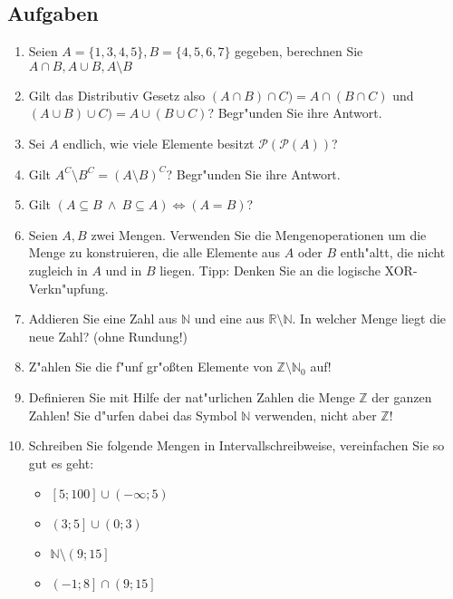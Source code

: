 \subsection{Aufgaben}
\begin{enumerate}
	\item Seien $A = \{1,3,4,5\}, B = \{4, 5, 6, 7\}$ gegeben, berechnen Sie $A \cap B, A \cup B, A \setminus B$
	\item Gilt das Distributiv Gesetz also $(A \cap B) \cap C) = A \cap (B \cap C)$ und $(A \cup B) \cup C) = A \cup (B \cup C)$? Begr"unden Sie ihre Antwort.
	\item Sei $A$ endlich, wie viele Elemente besitzt $\mathcal{P}(\mathcal{P}(A))$?
	\item Gilt $A^C \setminus B^C = (A \setminus B)^C$? Begr"unden Sie ihre Antwort.
	\item Gilt $(A \subseteq B \ \land \ B \subseteq A) \iff (A = B)$?
	\item Seien $A, B$ zwei Mengen. Verwenden Sie die Mengenoperationen um die Menge zu konstruieren, die alle Elemente aus $A$ oder $B$ enth"altt, die nicht zugleich in $A$ und in $B$ liegen. Tipp: Denken Sie an die logische XOR-Verkn"upfung.
	\item Addieren Sie eine Zahl aus $\mathbb N$ und eine aus $\mathbb R \setminus \mathbb N$. In welcher Menge liegt die neue Zahl? (ohne Rundung!)
	\item Z"ahlen Sie die f"unf gr"oßten Elemente von $\mathbb Z \setminus \mathbb N_0$ auf!
	\item Definieren Sie mit Hilfe der nat"urlichen Zahlen die Menge $\mathbb{Z}$ der ganzen Zahlen! Sie d"urfen dabei das Symbol $\mathbb N$ verwenden, nicht aber $\mathbb Z$!
	\item Schreiben Sie folgende Mengen in Intervallschreibweise, vereinfachen Sie so gut es geht:
\begin{itemize}
	\item $\left[5;100\right] \cup \left(- \infty; 5\right)$
	\item $\left(3;5\right] \cup \left(0; 3\right)$
	\item $\mathbb{N} \setminus \left(9;15\right]$
	\item $\left(-1;8\right] \cap \left(9;15\right]$
\end{itemize}	

\end{enumerate}
